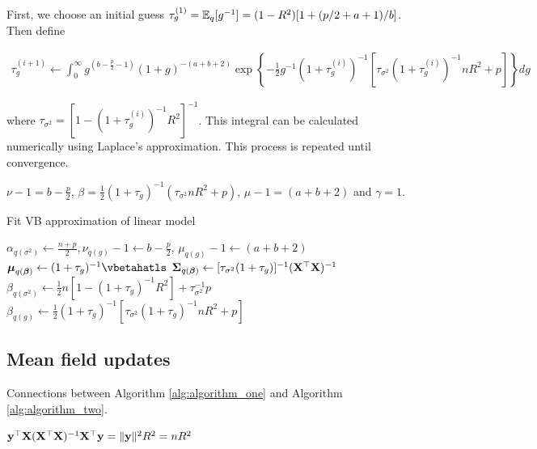 \documentclass{amsart}[12pt]
\begin{document}
First, we choose an initial guess $\tau_g^{(1)} = \mathbb{E}_q [g^{-1}] = (1 - R^2) [1 + (p / 2 + a + 1)/b]$. Then
define

\begin{align*}
	\tau_g^{(i+1)} \leftarrow \int_0^\infty g^{\left(b - \frac{p}{2} - 1\right)}                                   
	(1 + g)^{- (a + b + 2)}                                                                                        
	\exp \left \{- \frac{1}{2} g^{-1}  (1 + \tau_g^{(i)})^{-1} [\tau_{\sigma^2} (1 + \tau_g^{(i)})^{-1} n R^2 + p] 
	\right \} dg                                                                                                   
\end{align*}

\noindent where $\tau_{\sigma^2} = [1 - (1 + \tau_g^{(i)})^{-1} R^2]^{-1}$. This integral can be calculated
numerically using Laplace's approximation. This process is repeated until convergence.

$\nu - 1 = b - \frac{p}{2}$, 
$\beta = \frac{1}{2} (1 + \tau_g)^{-1} (\tau_{\sigma^2} n R^2 + p)$, 
$\mu - 1 = (a + b + 2)$ and $\gamma = 1$. 

\begin{algorithm}
	\caption{Fit VB approximation of linear model}
	\label{alg:algorithm_one}
	\begin{algorithmic}
		\REQUIRE $\alpha_{q(\sigma^2)} \leftarrow \frac{n + p}{2}, \nu_{q(g)} - 1 \leftarrow b - \frac{p}{2}$, $\mu_{q(g)} - 1 \leftarrow (a + b + 2)$
		\STATE $\vmu_{q(\vbeta)} \leftarrow (1 + \tau_g)^{-1} \vbetahatls$
		\STATE ${\boldsymbol \Sigma}_{q({\boldsymbol \beta})} \leftarrow [\tau_{\sigma^2} (1 + \tau_g)]^{-1} ({\bf X}^\top {\bf X})^{-1}$
		\STATE $\beta_{q(\sigma^2)} \leftarrow  \frac{1}{2} {n[1 - (1 + \tau_g)^{-1} R^2] + \tau_{\sigma^2}^{-1} p}$
		\STATE $\beta_{q(g)} \leftarrow \frac{1}{2} (1 + \tau_g)^{-1} [\tau_{\sigma^2} (1 + \tau_g)^{-1} n R^2 + p]$
		\ENDWHILE
	\end{algorithmic}
\end{algorithm}

\subsection{Mean field updates}
\label{sec:mean_field_updates}

Connections between Algorithm \ref{alg:algorithm_one} and Algorithm \ref{alg:algorithm_two}.

${\bf y}^\top {\bf X} ({\bf X}^\top {\bf X})^{-1} {\bf X}^\top {\bf y} =\|{\bf y}\|^2 R^2 = n R^2$
\end{document}
